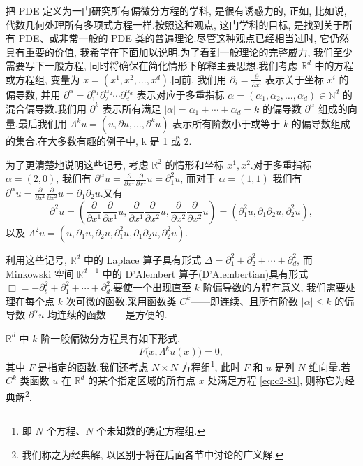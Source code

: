 把 PDE 定义为一门研究所有偏微分方程的学科, 是很有诱惑力的, 正如, 比如说, 代数几何处理所有多项式方程一样.按照这种观点, 这门学科的目标, 是找到关于所有 PDE、或非常一般的 PDE 类的普遍理论.尽管这种观点已经相当过时, 它仍然具有重要的价值, 我希望在下面加以说明.为了看到一般理论的完整威力, 我们至少需要写下一般方程, 同时将确保在简化情形下解释主要思想.我们考虑 $\mathbb{R}^{d}$ 中的方程或方程组, 变量为 $x = (x^{1}, x^{2}, \ldots, x^{d})$.同前, 我们用
$\partial_{i} = \frac{\partial}{\partial x^{i}}$
表示关于坐标 $x^{i}$ 的偏导数, 并用
$\partial^{\alpha} = \partial_{1}^{\alpha_{1}} \partial_{2}^{\alpha_{2}} \cdots \partial_{d}^{\alpha_{d}}$
表示对应于多重指标 $\alpha = (\alpha_{1}, \alpha_{2}, \ldots, \alpha_{d}) \in \mathbb{N}^{d}$ 的混合偏导数.我们用 $\partial^{k}$ 表示所有满足 $|\alpha| = \alpha_{1} + \cdots + \alpha_{d} = k$ 的偏导数 $\partial^{\alpha}$ 组成的向量.最后我们用
$\Lambda^{k} u = (u, \partial u, \ldots, \partial^{k} u)$
表示所有阶数小于或等于 $k$ 的偏导数组成的集合.在大多数有趣的例子中, k 是 1 或 2.

\begin{example*}
为了更清楚地说明这些记号, 考虑 $\mathbb{R}^{2}$ 的情形和坐标 $x^{1}, x^{2}$.对于多重指标 $\alpha = (2, 0)$, 我们有
$\partial^{\alpha} u = \frac{\partial}{\partial x^{1}} \frac{\partial}{\partial x^{1}} u = \partial_{1}^{2} u$,
而对于 $\alpha = (1, 1)$ 我们有
$\partial^{\alpha} u = \frac{\partial}{\partial x^{1}} \frac{\partial}{\partial x^{2}} u = \partial_{1} \partial_{2} u$.又有
\[
\partial^{2} u = \left( \frac{\partial}{\partial x^{1}} \frac{\partial}{\partial x^{1}} u, \frac{\partial}{\partial x^{1}} \frac{\partial}{\partial x^{2}} u, \frac{\partial}{\partial x^{2}} \frac{\partial}{\partial x^{2}} u \right) = (\partial_{1}^{2} u, \partial_{1} \partial_{2} u, \partial_{2}^{2} u),
\]
以及
$\Lambda^{2} u = (u, \partial_{1} u, \partial_{2} u, \partial_{1}^{2} u, \partial_{1} \partial_{2} u, \partial_{2}^{2} u)$.
\end{example*}

利用这些记号, $\mathbb{R}^{d}$ 中的 Laplace 算子具有形式
$\Delta = \partial_{1}^{2} + \partial_{2}^{2} + \cdots + \partial_{d}^{2}$,
而 Minkowski 空间 $\mathbb{R}^{d+1}$ 中的 D'Alembert 算子(D'Alembertian)具有形式
$\Box = -\partial_{t}^{2} + \partial_{1}^{2} + \cdots + \partial_{d}^{2}$.要使一个出现直至 $k$ 阶偏导数的方程有意义, 我们需要处理在每个点 $k$ 次可微的函数.采用函数类 $C^{k}$——即连续、且所有阶数 $| \alpha | \leq k$ 的偏导数 $\partial^{\alpha} u$ 均连续的函数——是方便的.

\begin{definition*}
$\mathbb{R}^{d}$ 中 $k$ 阶一般偏微分方程具有如下形式,
\begin{equation}
F\bigl(x, \Lambda^{k} u(x)\bigr) = 0, \label{eq:c2-81}
\end{equation}
其中 $F$ 是指定的函数.我们还考虑 $N \times N$ 方程组\footnote{即 $N$ 个方程、$N$ 个未知数的确定方程组.}, 此时 $F$ 和 $u$ 是列 $N$ 维向量.若 $C^{k}$ 类函数 $u$ 在 $\mathbb{R}^{d}$ 的某个指定区域的所有点 $x$ 处满足方程 \eqref{eq:c2-81}, 则称它为经典解\footnote{我们称之为经典解, 以区别于将在后面各节中讨论的广义解.}.
\end{definition*}

